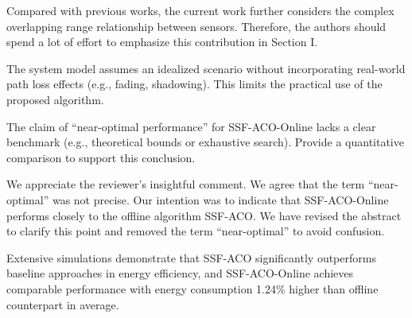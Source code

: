 \reviewer

\begin{revcomment}
	Compared with previous works, the current work further considers the complex overlapping range relationship between sensors. Therefore, the authors should spend a lot of effort to emphasize this contribution in Section I.
\end{revcomment}
\begin{revresponse}
	
	
	
\end{revresponse}

\begin{revcomment}
	The system model assumes an idealized scenario without incorporating real-world path loss effects (e.g., fading, shadowing). This limits the practical use of the proposed algorithm.
\end{revcomment}
\begin{revresponse}
	
\end{revresponse}

\begin{revcomment}
	The claim of ``near-optimal performance'' for SSF-ACO-Online lacks a clear benchmark (e.g., theoretical bounds or exhaustive search). Provide a quantitative comparison to support this conclusion.
\end{revcomment}
\begin{revresponse}
	We appreciate the reviewer's insightful comment.
	We agree that the term ``near-optimal'' was not precise. Our intention was to indicate that SSF-ACO-Online performs closely to the offline algorithm SSF-ACO. We have revised the abstract to clarify this point and removed the term ``near-optimal'' to avoid confusion.
	\begin{changes}
		Extensive simulations demonstrate that SSF-ACO significantly outperforms baseline approaches in energy efficiency, and SSF-ACO-Online achieves comparable performance with energy consumption 1.24\% higher than offline counterpart in average.
	\end{changes}
\end{revresponse}

